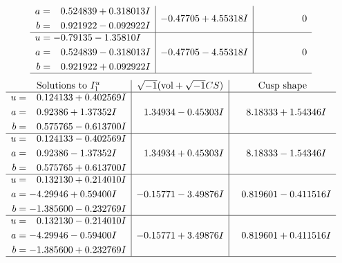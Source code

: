 \documentclass[1p]{elsarticle_modified}
\theoremstyle{definition}
\newcommand{\I}{\sqrt{-1}}
\begin{document}
$$\begin{array}{c|c|c}
\begin{aligned}
a &= \phantom{-}0.524839 + 0.318013 I \\
b &= \phantom{-}0.921922 - 0.092922 I\end{aligned}
 & -0.47705 + 4.55318 I & \phantom{-0.000000 } 0 \\ \hline\begin{aligned}
u &= -0.79135 - 1.35810 I \\
a &= \phantom{-}0.524839 - 0.318013 I \\
b &= \phantom{-}0.921922 + 0.092922 I\end{aligned}
 & -0.47705 - 4.55318 I & \phantom{-0.000000 } 0\\
 \hline 
 \end{array}$$\newpage$$\begin{array}{c|c|c}  
\text{Solutions to }I^u_{1}& \I (\text{vol} + \sqrt{-1}CS) & \text{Cusp shape}\\
 \hline 
\begin{aligned}
u &= \phantom{-}0.124133 + 0.402569 I \\
a &= \phantom{-}0.92386 + 1.37352 I \\
b &= \phantom{-}0.575765 - 0.613700 I\end{aligned}
 & \phantom{-}1.34934 - 0.45303 I & \phantom{-}8.18333 + 1.54346 I \\ \hline\begin{aligned}
u &= \phantom{-}0.124133 - 0.402569 I \\
a &= \phantom{-}0.92386 - 1.37352 I \\
b &= \phantom{-}0.575765 + 0.613700 I\end{aligned}
 & \phantom{-}1.34934 + 0.45303 I & \phantom{-}8.18333 - 1.54346 I \\ \hline\begin{aligned}
u &= \phantom{-}0.132130 + 0.214010 I \\
a &= -4.29946 + 0.59400 I \\
b &= -1.385600 - 0.232769 I\end{aligned}
 & -0.15771 - 3.49876 I & \phantom{-}0.819601 - 0.411516 I \\ \hline\begin{aligned}
u &= \phantom{-}0.132130 - 0.214010 I \\
a &= -4.29946 - 0.59400 I \\
b &= -1.385600 + 0.232769 I\end{aligned}
 & -0.15771 + 3.49876 I & \phantom{-}0.819601 + 0.411516 I\\
 \hline 
 \end{array}$$\newpage\newpage\renewcommand{\arraystretch}{1}
\end{document}
